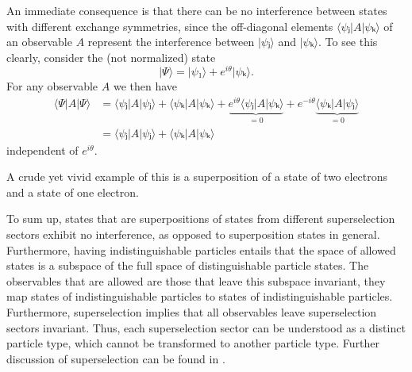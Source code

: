 An immediate consequence is that there can be no interference between states with different exchange symmetries, since the off-diagonal elements $⟨ψⱼ|A|ψₖ⟩$ of an observable $A$ represent the interference between $|ψⱼ⟩$ and $|ψₖ⟩$. To see this clearly, consider the (not normalized) state
\begin{equation}
  |Ψ⟩ = |ψ₁⟩ + e^{iθ}|ψₖ⟩.
\end{equation}
For any observable $A$ we then have
\begin{equation}
  \begin{aligned}
    ⟨Ψ|A|Ψ⟩
    &= ⟨ψⱼ|A|ψⱼ⟩ + ⟨ψₖ|A|ψₖ⟩ + \underbrace{e^{iθ}⟨ψⱼ|A|ψₖ⟩}_{=0} + e^{-iθ}\underbrace{⟨ψₖ|A|ψⱼ⟩}_{=0} \\
    &= ⟨ψⱼ|A|ψⱼ⟩ + ⟨ψₖ|A|ψₖ⟩
  \end{aligned}
\end{equation}
independent of $e^{iθ}$.

A crude yet vivid example of this is a superposition of a state of two electrons and a state of one electron.

To sum up, states that are superpositions of states from different superselection sectors exhibit no interference, as opposed to superposition states in general. Furthermore, having indistinguishable particles entails that the space of allowed states is a subspace of the full space of distinguishable particle states. The observables that are allowed are those that leave this subspace invariant, they map states of indistinguishable particles to states of indistinguishable particles. Furthermore, superselection implies that all observables leave superselection sectors invariant. Thus, each superselection sector can be understood as a distinct particle type, which cannot be transformed to another particle type. Further discussion of superselection can be found in \cite{ballentine,preskill,kitaev}.





































